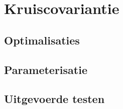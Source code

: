\chapter{Kruiscovariantie}

\section{Optimalisaties}


\section{Parameterisatie}

\section{Uitgevoerde testen}

